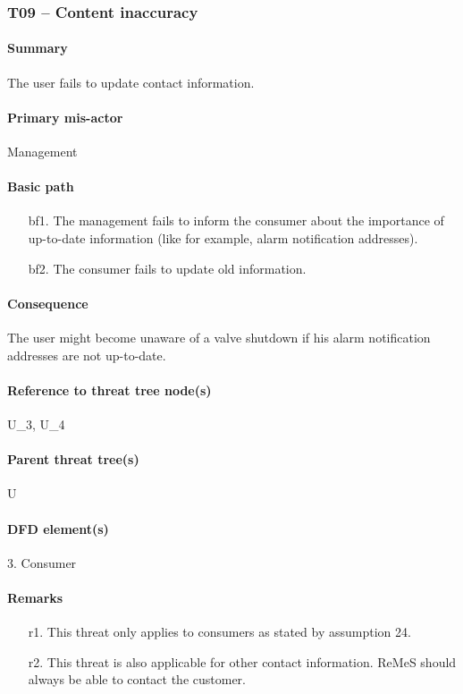\subsubsection{T09 -- Content inaccuracy} 

\paragraph{Summary} The user fails to update contact information. 

\paragraph{Primary mis-actor} Management

\paragraph{Basic path}
\begin{enumerate}
	\item[bf1.] The management fails to inform the consumer about the importance of
	up-to-date information (like for example, alarm notification addresses).
    \item[bf2.] The consumer fails to update old information.
\end{enumerate}

\paragraph{Consequence} The user might become unaware of a valve shutdown if his
alarm notification addresses are not up-to-date.

\paragraph{Reference to threat tree node(s)} U\_3, U\_4

\paragraph{Parent threat tree(s)} U

\paragraph{DFD element(s)} 3. Consumer

\paragraph{Remarks}
\begin{enumerate}
     \item[r1.] This threat only applies to consumers as stated by assumption
     24.
     \item[r2.] This threat is also applicable for other contact information.
     ReMeS should always be able to contact the customer.
\end{enumerate}
